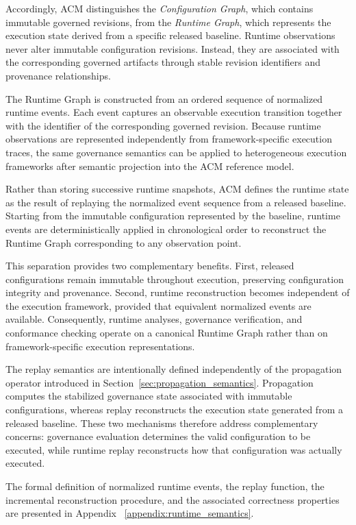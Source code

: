 \documentclass[10pt]{article}
\begin{document}
Accordingly, ACM distinguishes the \emph{Configuration Graph}, which contains
immutable governed revisions, from the \emph{Runtime Graph}, which represents
the execution state derived from a specific released baseline. Runtime
observations never alter immutable configuration revisions. Instead, they are
associated with the corresponding governed artifacts through stable revision
identifiers and provenance relationships.

The Runtime Graph is constructed from an ordered sequence of normalized runtime
events. Each event captures an observable execution transition together with the
identifier of the corresponding governed revision. Because runtime observations
are represented independently from framework-specific execution traces, the same
governance semantics can be applied to heterogeneous execution frameworks after
semantic projection into the ACM reference model.

Rather than storing successive runtime snapshots, ACM defines the runtime state
as the result of replaying the normalized event sequence from a released
baseline. Starting from the immutable configuration represented by the baseline,
runtime events are deterministically applied in chronological order to
reconstruct the Runtime Graph corresponding to any observation point.

This separation provides two complementary benefits. First, released
configurations remain immutable throughout execution, preserving configuration
integrity and provenance. Second, runtime reconstruction becomes independent of
the execution framework, provided that equivalent normalized events are
available. Consequently, runtime analyses, governance verification, and
conformance checking operate on a canonical Runtime Graph rather than on
framework-specific execution representations.

The replay semantics are intentionally defined independently of the propagation
operator introduced in Section~\ref{sec:propagation_semantics}. Propagation
computes the stabilized governance state associated with immutable
configurations, whereas replay reconstructs the execution state generated from a
released baseline. These two mechanisms therefore address complementary
concerns: governance evaluation determines the valid configuration to be
executed, while runtime replay reconstructs how that configuration was actually
executed.

The formal definition of normalized runtime events, the replay function, the
incremental reconstruction procedure, and the associated correctness properties
are presented in Appendix ~\ref{appendix:runtime_semantics}.
\end{document}
